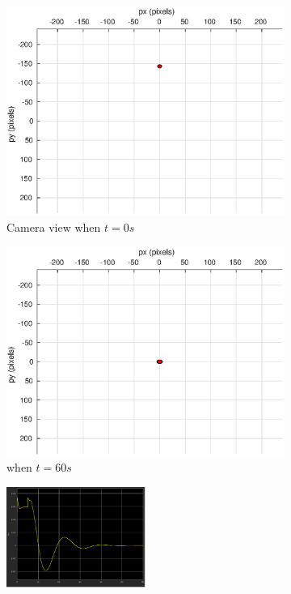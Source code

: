 \begin{figure}[htbp]
\begin{subfigure}[t]{0.45\linewidth}
		\includegraphics[width=\textwidth]{images/chapter4/image_camera_0mps}
		\caption{Camera view when $t=0s$}
	\end{subfigure}
	\begin{subfigure}[t]{0.45\linewidth}
		\includegraphics[width=\textwidth]{images/chapter4/image_camera_0mps_60s}
		\caption{when $t=60s$}
	\end{subfigure}
	\begin{subfigure}[t]{0.8\linewidth}
		\centering
		\includegraphics[width=0.5\textwidth]{images/chapter4/image_Ex_0mps}

\end{subfigure}
\end{figure}
